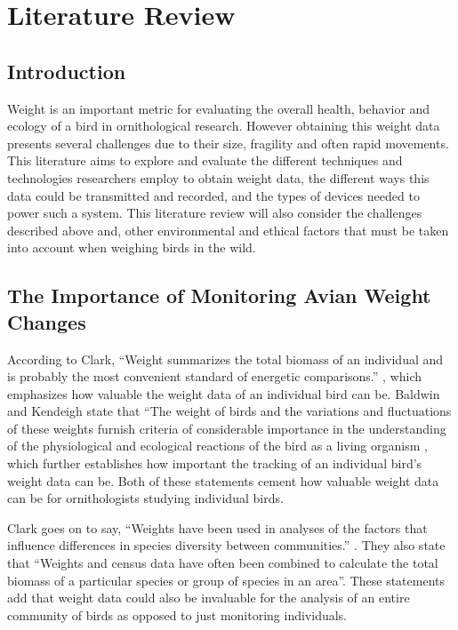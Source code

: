 \documentclass[class=report,11pt,crop=false]{standalone}
\begin{document}
\ifstandalone
\tableofcontents
\fi
\chapter{Literature Review \label{ch:literature}}
\vspace{0.5cm}

\section{Introduction}
Weight is an important metric for evaluating the overall health, behavior and ecology of a bird in ornithological research. However obtaining this weight data presents several challenges due to their size, fragility and often rapid movements. This literature aims to explore and evaluate the different techniques and technologies researchers employ to obtain weight data, the different ways this data could be transmitted and recorded, and the types of devices needed to power such a system. This literature review will also consider the challenges described above and, other environmental and ethical factors that must be taken into account when weighing birds in the wild.  

\section{The Importance of Monitoring Avian Weight Changes}
According to Clark, “Weight summarizes the total biomass of an individual and is probably the most convenient standard of energetic comparisons.” \cite{ClarckWeights}, which emphasizes how valuable the weight data of an individual bird can be. Baldwin and Kendeigh state that “The weight of birds and the variations and fluctuations of these weights furnish criteria of considerable importance in the understanding of the physiological and ecological reactions of the bird as a living organism \cite{BaldwinWeights}, which further establishes how important the tracking of an individual bird’s weight data can be. Both of these statements cement how valuable weight data can be for ornithologists studying individual birds.

Clark goes on to say, “Weights have been used in analyses of the factors that influence differences in species diversity between communities.” \cite{ClarckWeights}. They also state that “Weights and census data have often been combined to calculate the total biomass of a particular species or group of species in an area”. These statements add that weight data could also be invaluable for the analysis of an entire community of birds as opposed to just monitoring individuals.
\end{document}
